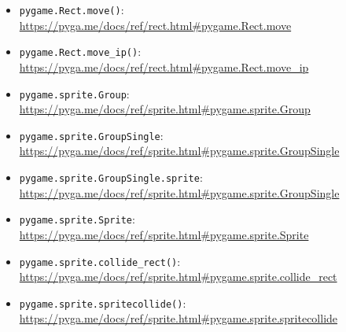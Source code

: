 \begin{itemize}
	\item \texttt{pygame.Rect.move()}:
	\\
	\url{https://pyga.me/docs/ref/rect.html#pygame.Rect.move}

	\item \texttt{pygame.Rect.move\_ip()}:
	\\
	\url{https://pyga.me/docs/ref/rect.html#pygame.Rect.move_ip}

	\item \texttt{pygame.sprite.Group}:
	\\
	\url{https://pyga.me/docs/ref/sprite.html#pygame.sprite.Group}

	\item \texttt{pygame.sprite.GroupSingle}:
	\\
	\url{https://pyga.me/docs/ref/sprite.html#pygame.sprite.GroupSingle}

	\item \texttt{pygame.sprite.GroupSingle.sprite}:
	\\
\url{https://pyga.me/docs/ref/sprite.html#pygame.sprite.GroupSingle}

	\item \texttt{pygame.sprite.Sprite}:
	\\
	\url{https://pyga.me/docs/ref/sprite.html#pygame.sprite.Sprite}
	
	\item \texttt{pygame.sprite.collide\_rect()}:
	\\
	\url{https://pyga.me/docs/ref/sprite.html#pygame.sprite.collide_rect}
	
	\item \texttt{pygame.sprite.spritecollide()}:
    \\
    \url{https://pyga.me/docs/ref/sprite.html#pygame.sprite.spritecollide}
\end{itemize}


